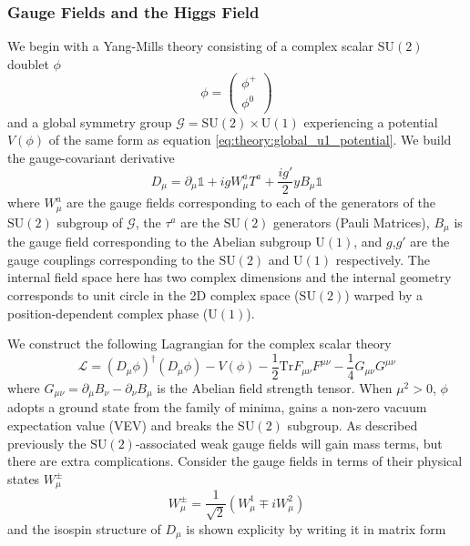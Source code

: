 \subsubsection{Gauge Fields and the Higgs Field}
We begin with a Yang-Mills theory consisting of a complex scalar $\mathrm{SU}(2)$ doublet $\phi$ 
\begin{equation}
    \label{eq:theory:higgs_doublet}
    \phi = \begin{pmatrix}
        \phi^{+} \\
        \phi^{0}
    \end{pmatrix}
\end{equation}
and a global symmetry group $\mathcal{G}=\mathrm{SU}(2)\times\mathrm{U}(1)$ experiencing a potential $V(\phi)$ of the same form as equation \ref{eq:theory:global_u1_potential}. We build the gauge-covariant derivative 
\begin{equation}
    \label{eq:theory:electroweak_cov_deriv}
    D_{\mu} = \partial_{\mu}\mathbb{1} + {ig}W_{\mu}^{a}T^{a} + \frac{ig'}{2}yB_{\mu}\mathbb{1}
\end{equation}
where $W_{\mu}^{a}$ are the gauge fields corresponding to each of the generators of the $\mathrm{SU}(2)$ subgroup of $\mathcal{G}$, the $\tau^{a}$ are the $\mathrm{SU}(2)$ generators (Pauli Matrices), $B_{\mu}$ is the gauge field corresponding to the Abelian subgroup $\mathrm{U}(1)$, and $g$,$g'$ are the gauge couplings corresponding to the $\mathrm{SU}(2)$ and $\mathrm{U}(1)$ respectively. 
The internal field space here has two complex dimensions and the internal geometry corresponds to unit circle in the 2D complex space ($\mathrm{SU}(2)$) warped by a position-dependent complex phase ($\mathrm{U}(1)$).


We construct the following Lagrangian for the complex scalar theory
\begin{equation}
    \label{eq:theory:electroweak_scalar_lagrangian}
    \mathcal{L} = (D_{\mu}\phi)^{\dag}(D_{\mu}\phi) - V(\phi) - \frac{1}{2}\mathrm{Tr}F_{\mu\nu}F^{\mu\nu} - \frac{1}{4}G_{\mu\nu}G^{\mu\nu}
\end{equation}
where $G_{\mu\nu} = \partial_{\mu}B_{\nu} - \partial_{\nu}B_{\mu}$ is the Abelian field strength tensor.
When $\mu^{2} > 0$, $\phi$ adopts a ground state from the family of minima, gains a non-zero vacuum expectation value (VEV) and breaks the $\mathrm{SU}(2)$ subgroup. 
As described previously the $\mathrm{SU}(2)$-associated weak gauge fields will gain mass terms, but there are extra complications. Consider the gauge fields in terms of their physical states $W_{\mu}^{\pm}$
\begin{equation}
    \label{eq:theory:physical_W_states}
    W^{\pm}_{\mu} = \frac{1}{\sqrt{2}}(W^{1}_{\mu}{\mp}iW^{2}_{\mu})
\end{equation}
and the isospin structure of $D_{\mu}$ is shown explicity by writing it in matrix form

